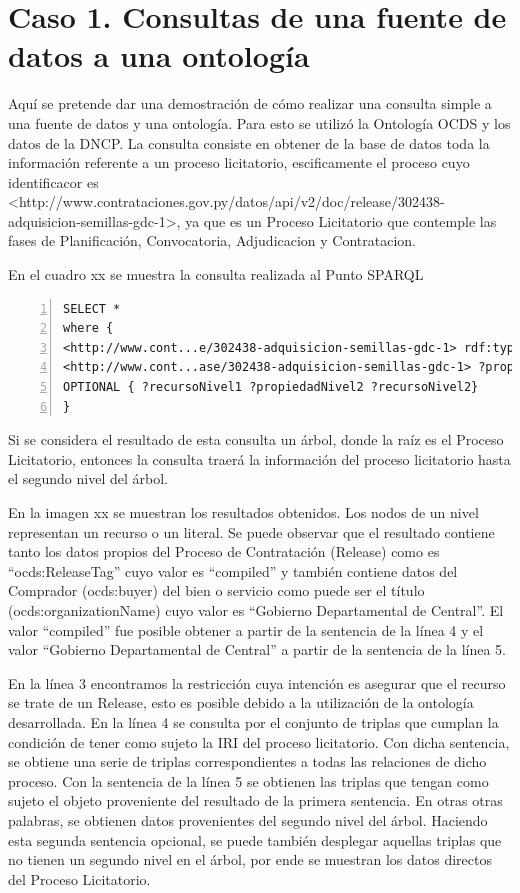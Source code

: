 \section{Caso 1. Consultas de una fuente de datos a una ontología}


Aquí se pretende dar una demostración de cómo realizar una consulta simple a una fuente de datos y una ontología. Para esto se utilizó la Ontología OCDS y los datos de la DNCP. La consulta consiste en obtener de la base de datos toda la información referente a un proceso licitatorio, escificamente el proceso cuyo identificacor es <http://www.contrataciones.gov.py/datos/api/v2/doc/release/302438-adquisicion-semillas-gdc-1>, ya que es un Proceso Licitatorio que contemple las fases de Planificación, Convocatoria, Adjudicacion y Contratacion.

En el cuadro xx se muestra la consulta realizada al Punto SPARQL

\begin{lstlisting}[captionpos=b, caption=Información referente al proceso licitatorio cuyo identificacor es 302438, label=lst:caso1,  numbers=left,  numberstyle=\tiny\color{mygray},
    basicstyle=\tiny,frame=single]
SELECT *  
where {    	
<http://www.cont...e/302438-adquisicion-semillas-gdc-1> rdf:type ocds:Release .
<http://www.cont...ase/302438-adquisicion-semillas-gdc-1> ?propiedadNivel1 ?recursoNivel1 .   
OPTIONAL { ?recursoNivel1 ?propiedadNivel2 ?recursoNivel2}
}  
 \end{lstlisting}


 Si se considera el resultado de esta consulta un árbol, donde la raíz es el Proceso Licitatorio, entonces la consulta traerá la información del proceso licitatorio hasta el segundo nivel del árbol.

En la imagen xx se muestran los resultados obtenidos. Los nodos de un nivel representan un recurso o un literal. Se puede observar que el resultado contiene tanto los datos propios del Proceso de Contratación (Release) como es “ocds:ReleaseTag” cuyo valor es “compiled” y también contiene datos del Comprador (ocds:buyer) del bien o servicio como puede ser el título (ocds:organizationName) cuyo valor es “Gobierno Departamental de Central”. El valor “compiled” fue posible obtener a partir de la sentencia de la línea 4 y el valor “Gobierno Departamental de Central” a partir de la sentencia de la línea 5.

En la línea 3 encontramos la restricción cuya intención es asegurar que el recurso se trate de un Release, esto es posible debido a la utilización de la ontología desarrollada. En la línea 4 se consulta por el conjunto de triplas que cumplan la condición de tener como sujeto la IRI del proceso licitatorio. Con dicha sentencia, se obtiene una serie de triplas correspondientes a todas las relaciones de dicho proceso. Con la sentencia de la línea 5 se obtienen las triplas que tengan como sujeto el objeto proveniente del resultado de la primera sentencia. En otras otras palabras, se obtienen datos provenientes del segundo nivel del árbol. Haciendo esta segunda sentencia opcional, se puede también desplegar aquellas triplas que no tienen un segundo nivel en el árbol, por ende se muestran los datos directos del Proceso Licitatorio.

